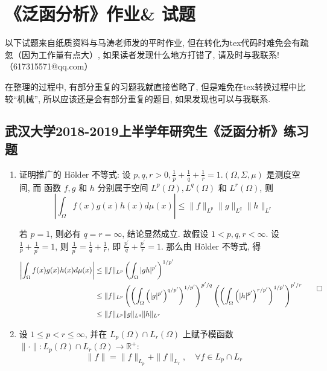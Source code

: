 \chapter{《泛函分析》作业\& 试题}
以下试题来自纸质资料与马涛老师发的平时作业, 但在转化为tex代码时难免会有疏忽（因为工作量有点大）, 如果读者发现什么地方打错了, 请及时与我联系! （617315571@qq.com）

在整理的过程中, 有部分重复的习题我就直接省略了, 但是难免在tex转换过程中比较“机械”, 所以应该还是会有部分重复的题目, 如果发现也可以与我联系.

\section{武汉大学2018-2019上半学年研究生《泛函分析》练习题}
\begin{enumerate}
    \item 证明推广的 Hölder 不等式: 设 $p, q, r>0, \frac{1}{p}+\frac{1}{q}+\frac{1}{r}=1 .(\Omega, \Sigma, \mu)$ 是测度空间, 而 函数 $f, g$ 和 $h$ 分别属于空间 $L^{p}(\Omega), L^{q}(\Omega)$ 和 $L^{r}(\Omega)$, 则
    \[
    \left|\int_{\Omega} f(x) g(x) h(x) d \mu(x)\right| \leq\|f\|_{L^{p}}\|g\|_{L^{q}}\|h\|_{L^{r}}
    \]
        \begin{answer}
            若 $p=1$, 则必有 $q=r=\infty$, 结论显然成立. 故假设 $1<p, q, r<\infty$. 设 $\frac{1}{p}+\frac{1}{p^{\prime}}=1$, 则 $\frac{1}{p^{\prime}}=\frac{1}{q}+\frac{1}{r}$, 即 $\frac{p^{\prime}}{q}+\frac{p^{\prime}}{r}=1$. 那么由 Hölder 不等式, 得
                \[
                \begin{aligned}
                \left|\int_{\Omega} f(x) g(x) h(x) d \mu (x)\right| & \leq\|f\|_{L^{p}}\left(\int_{\Omega}|g h|^{p^{\prime}}\right)^{1 / p^{\prime}}\\
                & \leq\|f\|_{L^{p}}\left(\left(\int_{\Omega}\left(|g|^{p^{\prime}}\right)^{q / p^{\prime}}\right)^{1 / p^{\prime}}\right)^{p^{\prime} / q}\left(\left(\int_{\Omega}\left(|h|^{p^{\prime}}\right)^{r / p^{\prime}}\right)^{1 / p^{\prime}}\right)^{p^{\prime} / r} \\
                & \leq\|f\|_{L^{p}}\|g\|_{L^{q}}\|h\|_{L^{r}}
                \end{aligned}\qedhere
                \]
        \end{answer}
    \item 设 $1 \leq p<r \leq \infty$, 并在 $L_{p}(\Omega) \cap L_{r}(\Omega)$ 上赋予模函数 $\|\cdot\|: L_{p}(\Omega) \cap L_{r}(\Omega) \rightarrow \mathbb{R}^{+}$:
    \[
    \|f\|=\|f\|_{L_{p}}+\|f\|_{L_{r}}, \quad \forall f \in L_{p} \cap L_{r}
\]
\end{enumerate}

